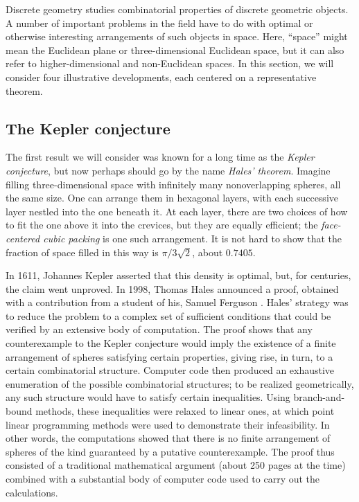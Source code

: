 \documentclass{amsart}
\theoremstyle{definition}
\theoremstyle{remark}
\numberwithin{equation}{section}
\begin{document}
Discrete geometry studies combinatorial properties of discrete geometric objects. A number of important problems in the field have to do with optimal or otherwise interesting arrangements of such objects in space. Here, ``space'' might mean the Euclidean plane or three-dimensional Euclidean space, but it can also refer to higher-dimensional and non-Euclidean spaces. In this section, we will consider four illustrative developments, each centered on a representative theorem.

\subsection{The Kepler conjecture}

The first result we will consider was known for a long time as the \emph{Kepler conjecture}, but now perhaps should go by the name \emph{Hales' theorem}. Imagine filling three-dimensional space with infinitely many nonoverlapping spheres, all the same size. One can arrange them in hexagonal layers, with each successive layer nestled into the one beneath it. At each layer, there are two choices of how to fit the one above it into the crevices, but they are equally efficient; the \emph{face-centered cubic packing} is one such arrangement. It is not hard to show that the fraction of space filled in this way is $\pi / 3 \sqrt 2$, about $0.7405$.

In 1611, Johannes Kepler asserted that this density is optimal, but, for centuries, the claim went unproved. In 1998, Thomas Hales announced a proof, obtained with a contribution from a student of his, Samuel Ferguson \cite{hales:05}. Hales' strategy was to reduce the problem to a complex set of sufficient conditions that could be verified by an extensive body of computation. The proof shows that any counterexample to the Kepler conjecture would imply the existence of a finite arrangement of spheres satisfying certain properties, giving rise, in turn, to a certain combinatorial structure. Computer code then produced an exhaustive enumeration of the possible combinatorial structures; to be realized geometrically, any such structure would have to satisfy certain inequalities. Using branch-and-bound methods, these inequalities were relaxed to linear ones, at which point linear programming methods were used to demonstrate their infeasibility. In other words, the computations showed that there is no finite arrangement of spheres of the kind guaranteed by a putative counterexample. The proof thus consisted of a traditional mathematical argument (about 250 pages at the time) combined with a substantial body of computer code used to carry out the calculations.
\end{document}
